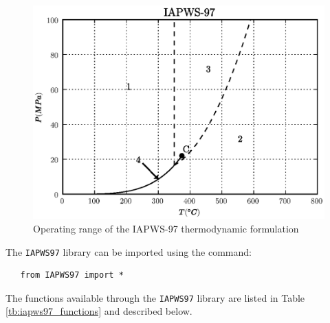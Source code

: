 \begin {figure}
  \begin{center}
    \includegraphics{ptplot.eps}
    \caption{Operating range of the IAPWS-97 thermodynamic formulation}
    \label{fg:iapws97_range}
  \end{center}
\end {figure}

The \texttt{IAPWS97} library can be imported using the command:

\begin{verbatim} 
   from IAPWS97 import *
\end{verbatim}

The functions available through the \texttt{IAPWS97} library are listed in Table \ref{tb:iapws97_functions} and described below.

